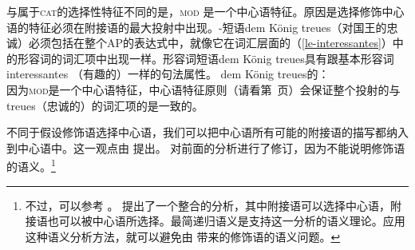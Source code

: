 与属于\textsc{cat}的选择性特征\subcatc 不同的是，\textsc{mod} 是一个中心语特征。原因是选择修饰中心语的特征必须在附接语的最大投射中出现。\nbarc{}-短语dem König treues（对国王的忠诚）必须包括在整个AP的表达式中，就像它在词汇层面的（\ref{le-interessantes}）中的形容词的词汇项中出现一样。形容词短语dem König treues具有跟基本形容词interessantes （有趣的）一样的句法属性。
\ea
\label{avm-dem-koenig-treues}
dem König treues的\catvc：\\
\z
因为\textsc{mod}是一个中心语特征，中心语特征原则（请看第~\pageref{prinzip-hfp}页）会保证整个投射的\modvc 与treues（忠诚的）的词汇项的\modvc 是一致的。

不同于假设修饰语选择中心语，我们可以把中心语所有可能的附接语的描写都纳入到中心语中。这一观点由 \citet[]{ps}提出。 \citet[\S~1.9]{ps2}对前面的分析进行了修订，因为不能说明修饰语的语义。\footnote{%
不过，可以参考 。 提出了一个整合的分析，其中附接语可以选择中心语，附接语也可以被中心语所选择。最简递归语义是支持这一分析的语义理论\indexmrsc。应用这种语义分析方法，就可以避免由 \citet*{ps}带来的修饰语的语义问题。
}

